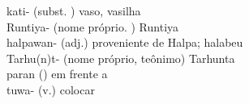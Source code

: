 
\normalsize
\noindent kati- (subst. \Neut) vaso, vasilha\\
Runtiya- (nome próprio. \Com) Runtiya\\
halpawan- (adj.) proveniente de Halpa; halabeu\\
Tarhu{(n)}t- (nome próprio, teônimo) Tarhunta\\
paran (\Prep) em frente a\\
tuwa- (v.) colocar\\
